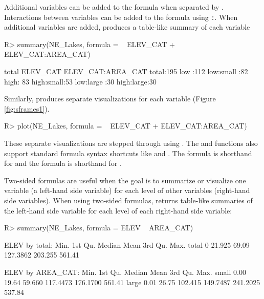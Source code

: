 \documentclass[
  shortnames]{jss}
\begin{document}
Additional variables can be added to the formula when separated by
\code{+}. Interactions between variables can be added to the formula
using \texttt{:}. When additional variables are added, 
produces a table-like summary of each variable

\begin{CodeChunk}
\begin{CodeInput}
R> summary(NE_Lakes, formula = ~ ELEV_CAT + ELEV_CAT:AREA_CAT)
\end{CodeInput}
\begin{CodeOutput}
   total     ELEV_CAT    ELEV_CAT:AREA_CAT
 total:195   low :112   low:small :82     
             high: 83   high:small:53     
                        low:large :30     
                        high:large:30     
\end{CodeOutput}
\end{CodeChunk}

Similarly,  produces separate visualizations for each
variable (Figure\(~\)\ref{fig:sframes1}).

\begin{CodeChunk}
\begin{CodeInput}
R> plot(NE_Lakes, formula = ~ ELEV_CAT + ELEV_CAT:AREA_CAT)
\end{CodeInput}
\end{CodeChunk}

These separate visualizations are stepped through using .
The  and  functions also support standard
formula syntax shortcuts like  and \code{*}. The formula
 is shorthand for 
and the formula  is shorthand for
.

Two-sided formulas are useful when the goal is to summarize or visualize
one variable (a left-hand side variable) for each level of other
variables (right-hand side variables). When using two-sided formulas,
 returns table-like summaries of the left-hand side
variable for each level of each right-hand side variable:

\begin{CodeChunk}
\begin{CodeInput}
R> summary(NE_Lakes, formula = ELEV ~ AREA_CAT)
\end{CodeInput}
\begin{CodeOutput}
ELEV by total: 
      Min. 1st Qu. Median     Mean 3rd Qu.   Max.
total    0  21.925  69.09 127.3862 203.255 561.41

ELEV by AREA_CAT: 
      Min. 1st Qu.  Median     Mean  3rd Qu.   Max.
small 0.00   19.64  59.660 117.4473 176.1700 561.41
large 0.01   26.75 102.415 149.7487 241.2025 537.84
\end{CodeOutput}
\end{CodeChunk}
\end{document}
